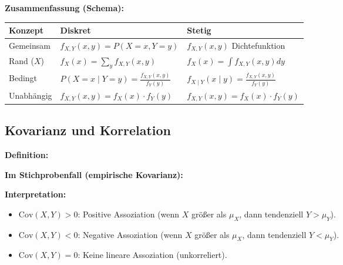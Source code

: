 \textbf{Zusammenfassung (Schema):}
\begin{table}[h]
    \centering
    \small
    \begin{tabular}{|l|l|l|}
        \hline
        \textbf{Konzept} & \textbf{Diskret}                                & \textbf{Stetig}                                         \\
        \hline
        Gemeinsam        & $f_{X,Y}(x, y) = P(X=x, Y=y)$                   & $f_{X,Y}(x, y)$ Dichtefunktion                          \\
        \hline
        Rand ($X$)       & $f_X(x) = \sum_y f_{X,Y}(x, y)$                 & $f_X(x) = \int f_{X,Y}(x, y) dy$                        \\
        \hline
        Bedingt          & $P(X=x \mid Y=y) = \frac{f_{X,Y}(x,y)}{f_Y(y)}$ & $f_{X \mid Y}(x \mid y) = \frac{f_{X,Y}(x,y)}{f_Y(y)}$   \\
        \hline
        Unabhängig       & $f_{X,Y}(x,y) = f_X(x) \cdot f_Y(y)$            & $f_{X,Y}(x,y) = f_X(x) \cdot f_Y(y)$                     \\
        \hline
    \end{tabular}
\end{table}

\newpage

\subsection{Kovarianz und Korrelation}


\textbf{Definition:}

\textbf{Im Stichprobenfall (empirische Kovarianz):}

\textbf{Interpretation:}
\begin{itemize}[leftmargin=1.5em]
    \item $\text{Cov}(X, Y) > 0$: Positive Assoziation (wenn $X$ größer als $\mu_X$, dann tendenziell $Y > \mu_Y$).
    \item $\text{Cov}(X, Y) < 0$: Negative Assoziation (wenn $X$ größer als $\mu_X$, dann tendenziell $Y < \mu_Y$).
    \item $\text{Cov}(X, Y) = 0$: Keine lineare Assoziation (unkorreliert).
\end{itemize}

